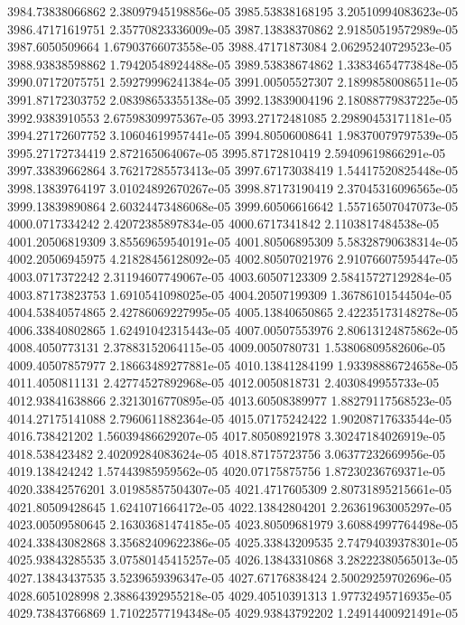 {3984.73838066862 2.38097945198856e-05
3985.53838168195 3.20510994083623e-05
3986.47171619751 2.35770823336009e-05
3987.13838370862 2.91850519572989e-05
3987.6050509664 1.67903766073558e-05
3988.47171873084 2.06295240729523e-05
3988.93838598862 1.79420548924488e-05
3989.53838674862 1.33834654773848e-05
3990.07172075751 2.59279996241384e-05
3991.00505527307 2.18998580086511e-05
3991.87172303752 2.08398653355138e-05
3992.13839004196 2.18088779837225e-05
3992.9383910553 2.67598309975367e-05
3993.27172481085 2.29890453171181e-05
3994.27172607752 3.10604619957441e-05
3994.80506008641 1.98370079797539e-05
3995.27172734419 2.872165064067e-05
3995.87172810419 2.59409619866291e-05
3997.33839662864 3.76217285573413e-05
3997.67173038419 1.54417520825448e-05
3998.13839764197 3.01024892670267e-05
3998.87173190419 2.37045316096565e-05
3999.13839890864 2.60324473486068e-05
3999.60506616642 1.55716507047073e-05
4000.0717334242 2.42072385897834e-05
4000.6717341842 2.1103817484538e-05
4001.20506819309 3.85569659540191e-05
4001.80506895309 5.58328790638314e-05
4002.20506945975 4.21828456128092e-05
4002.80507021976 2.91076607595447e-05
4003.0717372242 2.31194607749067e-05
4003.60507123309 2.58415727129284e-05
4003.87173823753 1.6910541098025e-05
4004.20507199309 1.36786101544504e-05
4004.53840574865 2.42786069227995e-05
4005.13840650865 2.42235173148278e-05
4006.33840802865 1.62491042315443e-05
4007.00507553976 2.80613124875862e-05
4008.4050773131 2.37883152064115e-05
4009.0050780731 1.53806809582606e-05
4009.40507857977 2.18663489277881e-05
4010.13841284199 1.93398886724658e-05
4011.4050811131 2.42774527892968e-05
4012.0050818731 2.4030849955733e-05
4012.93841638866 2.3213016770895e-05
4013.60508389977 1.88279117568523e-05
4014.27175141088 2.7960611882364e-05
4015.07175242422 1.90208717633544e-05
4016.738421202 1.56039486629207e-05
4017.80508921978 3.30247184026919e-05
4018.538423482 2.40209284083624e-05
4018.87175723756 3.06377232669956e-05
4019.138424242 1.57443985959562e-05
4020.07175875756 1.87230236769371e-05
4020.33842576201 3.01985857504307e-05
4021.4717605309 2.80731895215661e-05
4021.80509428645 1.6241071664172e-05
4022.13842804201 2.26361963005297e-05
4023.00509580645 2.16303681474185e-05
4023.80509681979 3.60884997764498e-05
4024.33843082868 3.35682409622386e-05
4025.33843209535 2.74794039378301e-05
4025.93843285535 3.07580145415257e-05
4026.13843310868 3.28222380565013e-05
4027.13843437535 3.5239659396347e-05
4027.67176838424 2.50029259702696e-05
4028.6051028998 2.38864392955218e-05
4029.40510391313 1.97732495716935e-05
4029.73843766869 1.71022577194348e-05
4029.93843792202 1.24914400921491e-05
}
